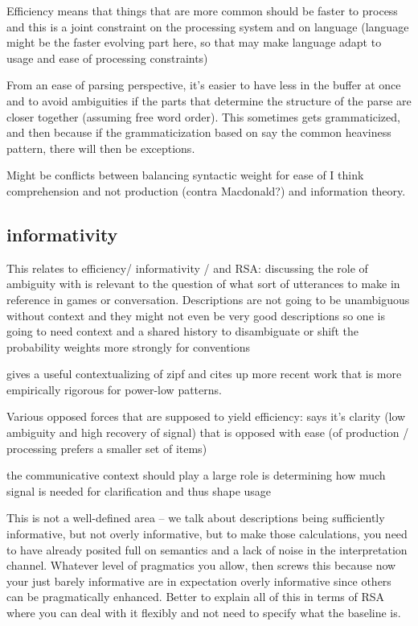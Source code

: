\documentclass[]{article}
\begin{document}
Efficiency means that things that are more common should be faster to process and this is a joint constraint on the processing system and on language (language might be the faster evolving part here, so that may make language adapt to usage and ease of processing constraints)

From an ease of parsing perspective, it's easier to have less in the buffer at once and to avoid ambiguities if the parts that determine the structure of the parse are closer together (assuming free word order). This sometimes gets grammaticized, and then because if the grammaticization based on say the common heaviness pattern, there will then be exceptions. 

Might be conflicts between balancing syntactic weight for ease of I think comprehension and not production (contra Macdonald?) and information theory. 


\subsection{informativity}

This relates to efficiency/ informativity / and RSA: \cite{piantadosi2012} discussing the role of ambiguity with is relevant to the question of what sort of utterances to make in reference in games or conversation. Descriptions are not going to be unambiguous without context and they might not even be very good descriptions so one is going to need context and a shared history to disambiguate or shift the probability weights more strongly for conventions

\cite{piantadosi2012} gives a useful contextualizing of zipf and cites up more recent work that is more empirically rigorous for power-low patterns. 

Various opposed forces that are supposed to yield efficiency: \cite{piantadosi2012} says it's clarity (low ambiguity and high recovery of signal) that is opposed with ease (of production / processing prefers a smaller set of items) 

the communicative context should play a large role is determining how much signal is needed for clarification and thus shape usage 

This is not a well-defined area -- we talk about descriptions being sufficiently informative, but not overly informative, but to make those calculations, you need to have already posited full on semantics and a lack of noise in the interpretation channel. Whatever level of pragmatics you allow, then screws this because now your just barely informative are in expectation overly informative since others can be pragmatically enhanced. Better to explain all of this in terms of RSA where you can deal with it flexibly and not need to specify what the baseline is. 
\end{document}
